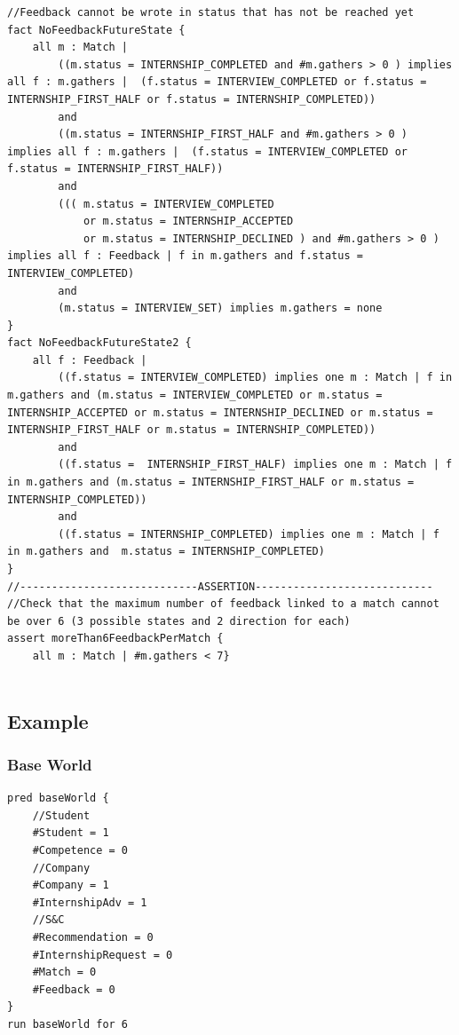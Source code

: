 \begin{lstlisting}
//Feedback cannot be wrote in status that has not be reached yet 
fact NoFeedbackFutureState {
	all m : Match |
		((m.status = INTERNSHIP_COMPLETED and #m.gathers > 0 ) implies all f : m.gathers |  (f.status = INTERVIEW_COMPLETED or f.status = INTERNSHIP_FIRST_HALF or f.status = INTERNSHIP_COMPLETED))
		and
		((m.status = INTERNSHIP_FIRST_HALF and #m.gathers > 0 ) implies all f : m.gathers |  (f.status = INTERVIEW_COMPLETED or f.status = INTERNSHIP_FIRST_HALF))
		and
		(((	m.status = INTERVIEW_COMPLETED 
			or m.status = INTERNSHIP_ACCEPTED 
			or m.status = INTERNSHIP_DECLINED ) and #m.gathers > 0 ) implies all f : Feedback | f in m.gathers and f.status = INTERVIEW_COMPLETED)
		and
		(m.status = INTERVIEW_SET) implies m.gathers = none
}
fact NoFeedbackFutureState2 {
	all f : Feedback |
		((f.status = INTERVIEW_COMPLETED) implies one m : Match | f in m.gathers and (m.status = INTERVIEW_COMPLETED or m.status = INTERNSHIP_ACCEPTED or m.status = INTERNSHIP_DECLINED or m.status = INTERNSHIP_FIRST_HALF or m.status = INTERNSHIP_COMPLETED))
		and
		((f.status =  INTERNSHIP_FIRST_HALF) implies one m : Match | f in m.gathers and (m.status = INTERNSHIP_FIRST_HALF or m.status = INTERNSHIP_COMPLETED))
		and
		((f.status = INTERNSHIP_COMPLETED) implies one m : Match | f in m.gathers and  m.status = INTERNSHIP_COMPLETED)
}
//----------------------------ASSERTION----------------------------
//Check that the maximum number of feedback linked to a match cannot be over 6 (3 possible states and 2 direction for each)
assert moreThan6FeedbackPerMatch {
	all m : Match | #m.gathers < 7}


\end{lstlisting}
\clearpage
\subsection{Example}

\subsubsection{Base World}
\begin{lstlisting}
pred baseWorld {
	//Student
	#Student = 1
	#Competence = 0
	//Company
	#Company = 1
	#InternshipAdv = 1
	//S&C
	#Recommendation = 0
	#InternshipRequest = 0
	#Match = 0
	#Feedback = 0
}
run baseWorld for 6
\end{lstlisting}

